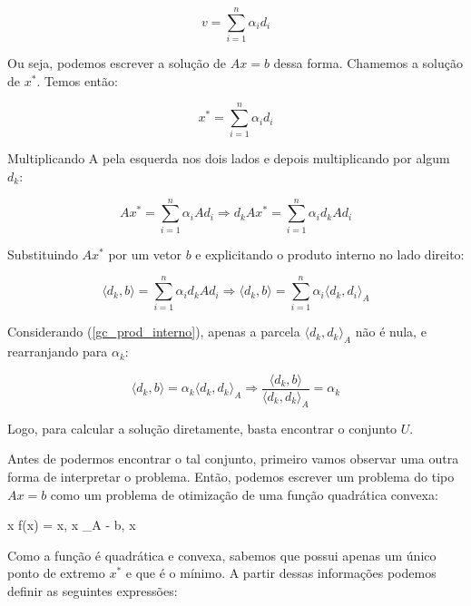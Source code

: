 \begin{equation}
v = \sum_{i=1}^n \alpha_i d_i
\end{equation}

Ou seja, podemos escrever a solução de \(Ax = b\) dessa forma. Chamemos a solução de
\(x^*\). Temos então:

\begin{equation}
x^* = \sum_{i=1}^n \alpha_i d_i
\end{equation}

Multiplicando A pela esquerda nos dois lados e depois multiplicando por algum \(d_k\):

\begin{equation}
Ax^* = \sum_{i=1}^n \alpha_i Ad_i \Rightarrow  d_k A x^* = \sum_{i=1}^n \alpha_i d_k A d_i
\end{equation}

Substituindo \(Ax^*\) por um vetor \(b\) e explicitando o produto interno no lado direito:

\begin{equation}
  \langle d_k, b \rangle = \sum_{i=1}^n \alpha_i d_k A d_i \Rightarrow \langle d_k, b \rangle = \sum_{i=1}^n \alpha_i \langle d_k ,d_i \rangle_A  
\end{equation}

Considerando (\ref{gc_prod_interno}), apenas a parcela \( \langle d_k, d_k \rangle_A \) não é nula, e rearranjando para
\(\alpha_k\):

\begin{equation}
\langle d_k, b \rangle  = \alpha_k \langle d_k , d_k \rangle_A \Rightarrow \frac{\langle d_k, b \rangle}{\langle d_k , d_k \rangle_A} = \alpha_k
\end{equation}

Logo, para calcular a solução diretamente, basta encontrar o conjunto \(U\).

Antes de podermos encontrar o tal conjunto, primeiro vamos observar uma outra forma de
interpretar o problema. Então, podemos escrever um problema do tipo \(Ax = b\) como um
problema de otimização de uma função quadrática convexa:

\vspace{-15pt}
\begin{mini!}
{x}{ f(x) =  \langle x, x \rangle_A - \langle b, x \rangle \label{gcq_obj}}{\label{prob_gcq}}{}
\end{mini!}

Como a função é quadrática e convexa, sabemos que possui apenas um único ponto de
extremo \(x^*\) e que é o mínimo. A partir dessas informações podemos definir as
seguintes expressões:

